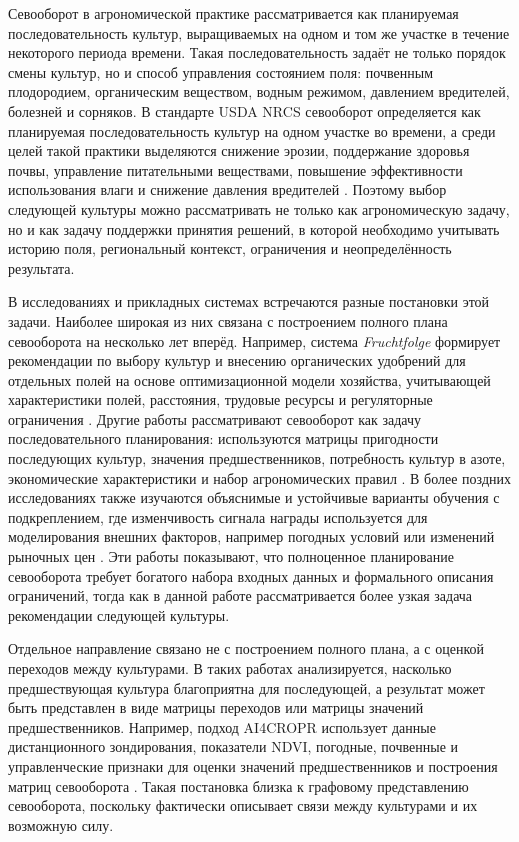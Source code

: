 \par
{}

Севооборот в агрономической практике рассматривается как планируемая последовательность культур, выращиваемых на одном
и том же участке в течение некоторого периода времени. Такая последовательность задаёт не только порядок смены культур,
но и способ управления состоянием поля: почвенным плодородием, органическим веществом, водным режимом, давлением
вредителей, болезней и сорняков. В стандарте USDA NRCS севооборот определяется как планируемая последовательность культур
на одном участке во времени, а среди целей такой практики выделяются снижение эрозии, поддержание здоровья почвы,
управление питательными веществами, повышение эффективности использования влаги и снижение давления вредителей
\cite{nrcs2014conservation_crop_rotation}. Поэтому выбор следующей культуры можно рассматривать не только как
агрономическую задачу, но и как задачу поддержки принятия решений, в которой необходимо учитывать историю поля,
региональный контекст, ограничения и неопределённость результата.

В исследованиях и прикладных системах встречаются разные постановки этой задачи. Наиболее широкая из них связана с
построением полного плана севооборота на несколько лет вперёд. Например, система \textit{Fruchtfolge} формирует
рекомендации по выбору культур и внесению органических удобрений для отдельных полей на основе оптимизационной модели
хозяйства, учитывающей характеристики полей, расстояния, трудовые ресурсы и регуляторные ограничения
\cite{pahmeyer2021fruchtfolge}. Другие работы рассматривают севооборот как задачу последовательного планирования:
используются матрицы пригодности последующих культур, значения предшественников, потребность культур в азоте,
экономические характеристики и набор агрономических правил \cite{fenz2023crop_rotation_planning}. В более поздних
исследованиях также изучаются объяснимые и устойчивые варианты обучения с подкреплением, где изменчивость сигнала
награды используется для моделирования внешних факторов, например погодных условий или изменений рыночных цен
\cite{goldenits2025tabular_rl_crop_rotation}. Эти работы показывают, что полноценное планирование
севооборота требует богатого набора входных данных и формального описания ограничений, тогда как в данной работе
рассматривается более узкая задача рекомендации следующей культуры.

Отдельное направление связано не с построением полного плана, а с оценкой переходов между культурами. В таких работах
анализируется, насколько предшествующая культура благоприятна для последующей, а результат может быть представлен в
виде матрицы переходов или матрицы значений предшественников. Например, подход AI4CROPR использует данные дистанционного
зондирования, показатели NDVI, погодные, почвенные и управленческие признаки для оценки значений предшественников и
построения матриц севооборота \cite{fenz2023precrop_matrices}. Такая постановка близка к графовому представлению
севооборота, поскольку фактически описывает связи между культурами и их возможную силу.

